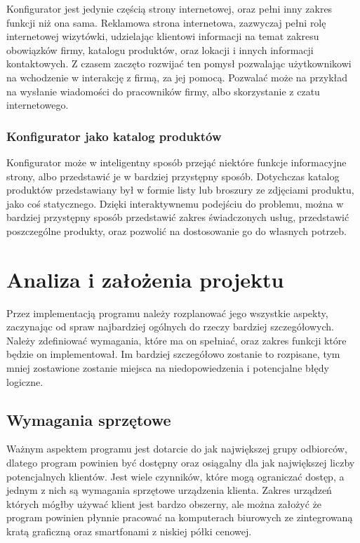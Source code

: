 \documentclass{article} %
\begin{document}
        Konfigurator jest jedynie częścią strony internetowej, oraz pełni inny zakres funkcji niż ona sama. Reklamowa strona internetowa, zazwyczaj pełni rolę internetowej wizytówki, udzielając klientowi informacji na temat zakresu obowiązków firmy, katalogu produktów, oraz lokacji i innych informacji kontaktowych. Z czasem zaczęto rozwijać ten pomysł pozwalając użytkownikowi na wchodzenie w interakcję z firmą, za jej pomocą. Pozwalać może na przykład na wysłanie wiadomości do pracowników firmy, albo skorzystanie z czatu internetowego.
        \\
        
        \subsubsection{Konfigurator jako katalog produktów}
        Konfigurator może w inteligentny sposób przejąć niektóre funkcje informacyjne strony, albo przedstawić je w bardziej przystępny sposób. Dotychczas katalog produktów przedstawiany był w formie listy lub broszury ze zdjęciami produktu, jako coś statycznego. Dzięki interaktywnemu podejściu do problemu, można w bardziej przystępny sposób przedstawić zakres świadczonych usług, przedstawić poszczególne produkty, oraz pozwolić na dostosowanie go do własnych potrzeb.
        \\
        
    \newpage
        
\section{Analiza i założenia projektu}
    Przez implementacją programu należy rozplanować jego wszystkie aspekty, zaczynając od spraw najbardziej ogólnych do rzeczy bardziej szczegółowych. Należy zdefiniować wymagania, które ma on spełniać, oraz zakres funkcji które będzie on implementował. Im bardziej szczegółowo zostanie to rozpisane, tym mniej zostawione zostanie miejsca na niedopowiedzenia i potencjalne błędy logiczne.
    \\
    
    \subsection{Wymagania sprzętowe}
        Ważnym aspektem programu jest dotarcie do jak największej grupy odbiorców, dlatego program powinien być dostępny oraz osiągalny dla jak największej liczby potencjalnych klientów. Jest wiele czynników, które mogą ograniczać dostęp, a jednym z nich są wymagania sprzętowe urządzenia klienta. Zakres urządzeń których mógłby używać klient jest bardzo obszerny, ale można założyć że program powinien płynnie pracować na komputerach biurowych ze zintegrowaną kratą graficzną oraz smartfonami z niskiej półki cenowej.
        \\
        
\end{document}

